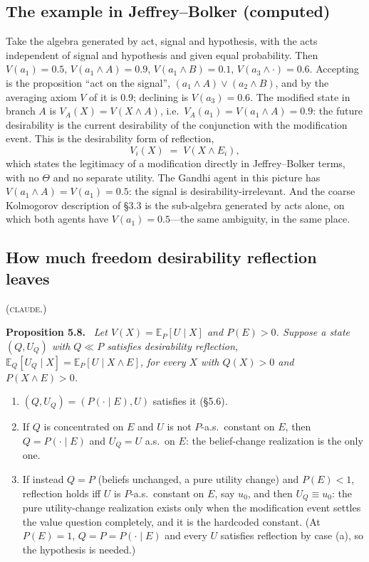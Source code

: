 \documentclass[11pt,a4paper]{article}
\newcommand{\E}{\mathbb{E}}
\newcommand{\CLAUDE}{\textnormal{\scshape claude}}
\newenvironment{stmt}[2]{\par\medskip\noindent\textbf{#1 #2.}\ \itshape\ignorespaces}{\par\medskip}
\begin{document}
\subsection{The example in Jeffrey--Bolker (computed)}
Take the algebra generated by act, signal and hypothesis, with the acts independent of signal and hypothesis and given equal probability. Then $V(a_1) = 0.5$, $V(a_1 \wedge A) = 0.9$, $V(a_1 \wedge B) = 0.1$, $V(a_3 \wedge \cdot) = 0.6$. Accepting is the proposition ``act on the signal'', $(a_1 \wedge A) \vee (a_2 \wedge B)$, and by the averaging axiom $V$ of it is $0.9$; declining is $V(a_3) = 0.6$. The modified state in branch $A$ is $V_A(X) = V(X \wedge A)$, i.e.\ $V_A(a_1) = V(a_1 \wedge A) = 0.9$: the future desirability is the current desirability of the conjunction with the modification event. This is the desirability form of reflection,
\[
V_i(X) \;=\; V(X \wedge E_i),
\]
which states the legitimacy of a modification directly in Jeffrey--Bolker terms, with no $\Theta$ and no separate utility. The Gandhi agent in this picture has $V(a_1 \wedge A) = V(a_1) = 0.5$: the signal is desirability-irrelevant. And the coarse Kolmogorov description of \S3.3 is the sub-algebra generated by acts alone, on which both agents have $V(a_1) = 0.5$---the same ambiguity, in the same place.

\subsection{How much freedom desirability reflection leaves}
(\CLAUDE.)
\begin{stmt}{Proposition}{5.8}
Let $V(X) = \E_P[U \mid X]$ and $P(E) > 0$. Suppose a state $(Q, U_Q)$ with $Q \ll P$ satisfies desirability reflection, $\E_Q[U_Q \mid X] = \E_P[U \mid X \wedge E]$, for every $X$ with $Q(X) > 0$ and $P(X \wedge E) > 0$.
\begin{enumerate}[label=(\alph*),leftmargin=2.5em]
\item $(Q, U_Q) = (P(\cdot \mid E), U)$ satisfies it (\S5.6).
\item If $Q$ is concentrated on $E$ and $U$ is not $P$-a.s.\ constant on $E$, then $Q = P(\cdot \mid E)$ and $U_Q = U$ a.s.\ on $E$: the belief-change realization is the only one.
\item If instead $Q = P$ (beliefs unchanged, a pure utility change) and $P(E) < 1$, reflection holds iff $U$ is $P$-a.s.\ constant on $E$, say $u_0$, and then $U_Q \equiv u_0$: the pure utility-change realization exists only when the modification event settles the value question completely, and it is the hardcoded constant. (At $P(E) = 1$, $Q = P = P(\cdot \mid E)$ and every $U$ satisfies reflection by case (a), so the hypothesis is needed.)
\end{enumerate}
\end{stmt}
\end{document}
